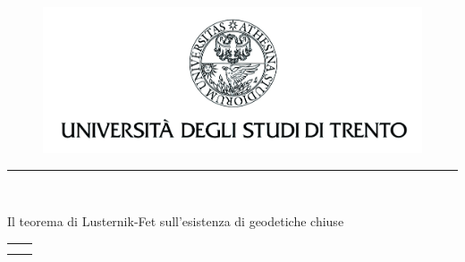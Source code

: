 \begin{titlepage}
	\begin{figure}[h]
		\centering
		\includegraphics{image1.jpeg}
	\end{figure}
	
	
	\setlength{\parskip}{-12pt} %
	\noindent\rule{\textwidth}{.5pt}
	
	\begin{center}
		\fontsize{14pt}{18pt}\selectfont{DIPARTIMENTO DI MATEMATICA}\\
		\vspace{0.25cm}
		\fontsize{14pt}{18pt}\selectfont {Corso di Laurea  in Matematica}
	\end{center}
	
	\vspace{3 cm} 
	
	\begin{center}
		{\fontsize{20}{30}\selectfont Il teorema di Lusternik-Fet sull'esistenza di geodetiche chiuse \par} %
	
	\end{center}
	\vspace{3 cm}
	
	\begin{tabular}{p{} p{}}
		\fontsize{14pt}{22pt}\selectfont {Supervisore:} & \fontsize{14pt}{22pt}\selectfont{Candidato:} \\
		\fontsize{16pt}{30pt}\selectfont {Alessandro Carlotto} & \fontsize{16pt}{30pt}\selectfont {Andrea Martelli} \\
	\end{tabular}
	
	

\end{titlepage}
